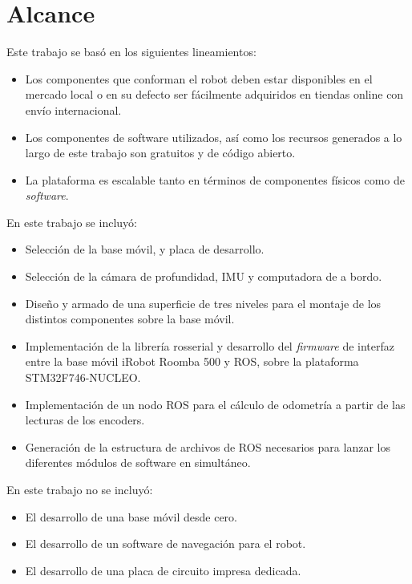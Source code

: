 \section{Alcance}

Este trabajo se basó en los siguientes lineamientos:

\begin{itemize}
	\item Los componentes que conforman el robot deben estar disponibles en el mercado local o en su defecto ser fácilmente adquiridos en tiendas online con envío internacional. 
	\item Los componentes de software utilizados, así como los recursos generados a lo largo de este trabajo son gratuitos y de código abierto.
	\item La plataforma es escalable tanto en términos de componentes físicos como de \textit{software}.
\end{itemize}

En este trabajo se incluyó:

\begin{itemize}
	\item Selección de la base móvil, y placa de desarrollo.
	\item Selección de la cámara de profundidad, IMU y computadora de a bordo.
	\item Diseño y armado de una superficie de tres niveles para el montaje de los distintos componentes sobre la base móvil.
	\item Implementación de la librería rosserial y desarrollo del \textit{firmware} de interfaz entre la base móvil iRobot Roomba 500 y ROS, sobre la plataforma STM32F746-NUCLEO.
	\item Implementación de un nodo ROS para el cálculo de odometría a partir de las lecturas de los encoders.
	\item Generación de la estructura de archivos de ROS necesarios para lanzar los diferentes módulos de software en simultáneo.
\end{itemize}

En este trabajo no se incluyó:

\begin{itemize}
	\item El desarrollo de una base móvil desde cero.
	\item El desarrollo de un software de navegación para el robot.
	\item El desarrollo de una placa de circuito impresa dedicada.
\end{itemize}